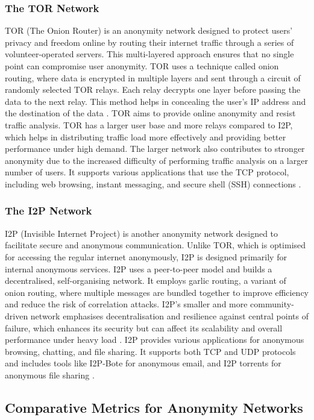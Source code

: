 \documentclass[12pt,conference]{IEEEtran}
\begin{document}
\subsubsection{The TOR Network} 
TOR (The Onion Router) is an anonymity network designed to protect users' privacy and freedom online by routing their internet traffic through a series of volunteer-operated servers. This multi-layered approach ensures that no single point can compromise user anonymity. TOR uses a technique called onion routing, where data is encrypted in multiple layers and sent through a circuit of randomly selected TOR relays. Each relay decrypts one layer before passing the data to the next relay. This method helps in concealing the user's IP address and the destination of the data \cite{TorTheSecondGenerationOnionRouter}. TOR aims to provide online anonymity and resist traffic analysis. TOR has a larger user base and more relays compared to I2P, which helps in distributing traffic load more effectively and providing better performance under high demand. The larger network also contributes to stronger anonymity due to the increased difficulty of performing traffic analysis on a larger number of users. It supports various applications that use the TCP protocol, including web browsing, instant messaging, and secure shell (SSH) connections \cite{TorTheSecondGenerationOnionRouter}.
\subsubsection{The I2P Network}
I2P (Invisible Internet Project) is another anonymity network designed to facilitate secure and anonymous communication. Unlike TOR, which is optimised for accessing the regular internet anonymously, I2P is designed primarily for internal anonymous services. I2P uses a peer-to-peer model and builds a decentralised, self-organising network. It employs garlic routing, a variant of onion routing, where multiple messages are bundled together to improve efficiency and reduce the risk of correlation attacks. I2P's smaller and more community-driven network emphasises decentralisation and resilience against central points of failure, which enhances its security but can affect its scalability and overall performance under heavy load \cite{i2p}. I2P provides various applications for anonymous browsing, chatting, and file sharing. It supports both TCP and UDP protocols and includes tools like I2P-Bote for anonymous email, and I2P torrents for anonymous file sharing \cite{zantout02}.
\subsection{Comparative Metrics for Anonymity Networks}
\end{document}
